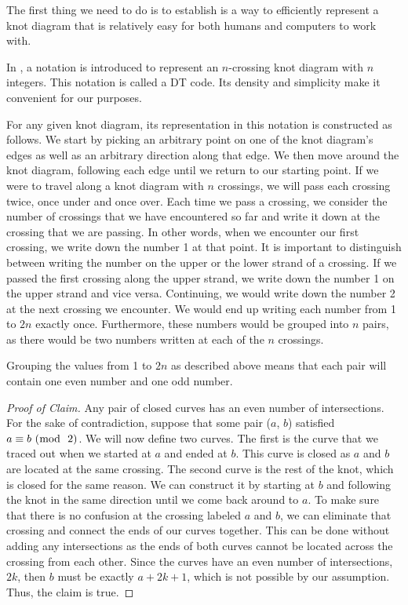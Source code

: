 \begin{paper}

The first thing we need to do is to establish is a way to efficiently represent
a knot diagram that is relatively easy for both humans and computers to work
with.

In \cite{htw}, a notation is introduced to represent an $n$-crossing knot
diagram with $n$ integers.
This notation is called a DT code.
Its density and simplicity make it convenient for our purposes.

For any given knot diagram, its representation in this notation is constructed
as follows.
We start by picking an arbitrary point on one of the knot diagram's edges as
well as an arbitrary direction along that edge.
We then move around the knot diagram, following each edge until we return to our
starting point.
If we were to travel along a knot diagram with $n$ crossings, we will pass each
crossing twice, once under and once over.
Each time we pass a crossing, we consider the number of crossings that we
have encountered so far and write it down at the crossing that we are passing.
In other words, when we encounter our first crossing, we write down the number 1
at that point.
It is important to distinguish between writing the number on the upper or the
lower strand of a crossing.
If we passed the first crossing along the upper strand, we write down the number
1 on the upper strand and vice versa.
Continuing, we would write down the number 2 at the next crossing we encounter.
We would end up writing each number from 1 to $2n$ exactly once.
Furthermore, these numbers would be grouped into $n$ pairs, as there would be
two numbers written at each of the $n$ crossings.

\begin{paperclm}
Grouping the values from 1 to $2n$ as described above means that each pair will
contain one even number and one odd number.
\end{paperclm}
\begin{proof}[Proof of Claim]
Any pair of closed curves has an even number of intersections.
For the sake of contradiction, suppose that some pair ($a$, $b$) satisfied
$a\equiv b~(\hspace{-1.5ex}\mod~2)$.
We will now define two curves.
The first is the curve that we traced out when we started at $a$ and ended at
$b$.
This curve is closed as $a$ and $b$ are located at the same crossing.
The second curve is the rest of the knot, which is closed for the same reason.
We can construct it by starting at $b$ and following the knot in the same
direction until we come back around to $a$.
To make sure that there is no confusion at the crossing labeled $a$ and $b$, we
can eliminate that crossing and connect the ends of our curves together.
This can be done without adding any intersections as the ends of both curves
cannot be located across the crossing from each other.
Since the curves have an even number of intersections, $2k$, then $b$ must be
exactly $a+2k+1$, which is not possible by our assumption.
Thus, the claim is true.
\end{proof}


\end{paper}

